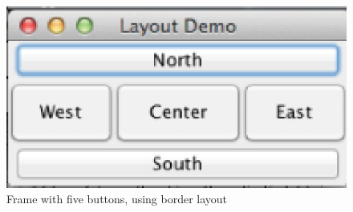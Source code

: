 


\begin {figure}

\includegraphics{figs/ch10/border.eps}

\caption {Frame with five buttons, using border layout}

\label {fig:border}

\end {figure}

